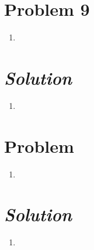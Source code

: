 \documentclass{article}
\begin{document}
\section*{Problem 9} 
\begin{enumerate}[label=\alph*)]
	\item %
\end{enumerate}
\section*{\textit{Solution}} 
\begin{enumerate}[label=\alph*)]
	\item %
\end{enumerate}

\section*{Problem } 
\begin{enumerate}[label=\alph*)]
	\item %
\end{enumerate}
\section*{\textit{Solution}} 
\begin{enumerate}[label=\alph*)]
	\item %
\end{enumerate}
\end{document}
